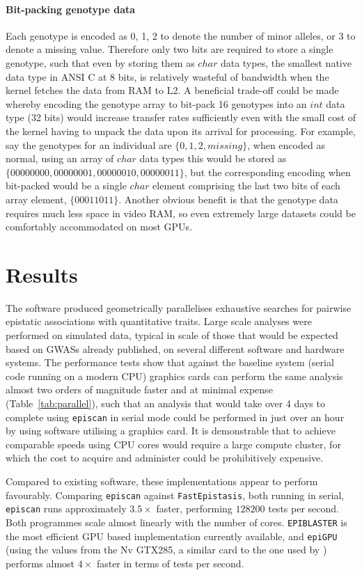 \paragraph{Bit-packing genotype data} Each genotype is encoded as 0, 1, 2 to denote the number of minor alleles, or 3 to denote a missing value. Therefore only two bits are required to store a single genotype, such that even by storing them as $char$ data types, the smallest native data type in ANSI C at 8 bits, is relatively wasteful of bandwidth when the kernel fetches the data from RAM to L2. A beneficial trade-off could be made whereby encoding the genotype array to bit-pack 16 genotypes into an $int$ data type (32 bits) would increase transfer rates sufficiently even with the small cost of the kernel having to unpack the data upon its arrival for processing. For example, say the genotypes for an individual are $\{0, 1, 2, missing\}$, when encoded as normal, using an array of $char$ data types this would be stored as $\{ 00000000, 00000001, 00000010, 00000011 \}$, but the corresponding encoding when bit-packed would be a single $char$ element comprising the last two bits of each array element, $\{ 00011011 \}$. Another obvious benefit is that the genotype data requires much less space in video RAM, so even extremely large datasets could be comfortably accommodated on most GPUs.


\section{Results}

The software produced geometrically parallelises exhaustive searches for pairwise epistatic associations with quantitative traits. Large scale analyses were performed on simulated data, typical in scale of those that would be expected based on GWASs already published, on several different software and hardware systems. The performance tests show that against the baseline system (serial code running on a modern CPU) graphics cards can perform the same analysis almost two orders of magnitude faster and at minimal expense (Table~\ref{tab:parallel}), such that an analysis that would take over 4 days to complete using {\tt episcan} in serial mode could be performed in just over an hour by using software utilising a graphics card. It is demonstrable that to achieve comparable speeds using CPU cores would require a large compute cluster, for which the cost to acquire and administer could be prohibitively expensive.

Compared to existing software, these implementations appear to perform favourably. Comparing {\tt episcan} against {\tt FastEpistasis}, both running in serial, {\tt episcan} runs approximately $3.5\times$ faster, performing $128200$ tests per second. Both programmes scale almost linearly with the number of cores. {\tt EPIBLASTER} is the most efficient GPU based implementation currently available, and {\tt epiGPU} (using the values from the Nv GTX285, a similar card to the one used by \cite{Kam-Thong2010}) performs almost $4 \times$ faster in terms of tests per second.


